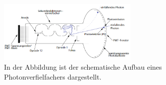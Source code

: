                 \FloatBarrier

                \begin{figure}[h]
                  \centering
                  \includegraphics[width = 0.6\textwidth]{pictures/photomultiplier.png}
                  \caption{In der Abbildung ist der schematische Aufbau eines Photonverfielfachers dargestellt.}
                  \label{fig:photomultiplier}
                \end{figure}
        
                \FloatBarrier
        
                \noindent

